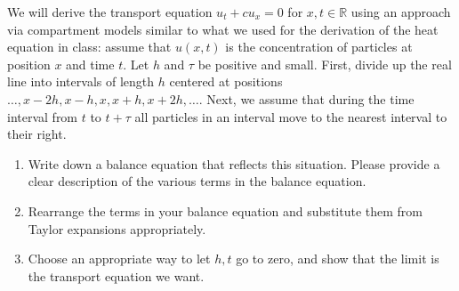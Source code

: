 \documentclass[plain]{pset}
\begin{document}
\begin{problem}
We will derive the transport equation \(u_t + cu_x = 0\) for \(x, t \in \mathbb{R}\) using an approach via compartment models similar to what we used for the derivation of the heat equation in class: assume that \(u(x, t)\) is the concentration of particles at position \(x\) and time \(t\). Let \(h\) and \(\tau\) be positive and small. First, divide up the real line into intervals of length \(h\) centered at positions \(\hdots, x-2h, x-h, x, x+h, x+2h, \hdots\). Next, we assume that during the time interval from \(t\) to \(t + \tau\) all particles in an interval move to the nearest interval to their right.
\begin{enumerate}[label = (\alph*)]
    \item Write down a balance equation that reflects this situation. Please provide a clear description of the various terms in the balance equation.
    \item Rearrange the terms in your balance equation and substitute them from Taylor expansions appropriately.
    \item Choose an appropriate way to let \(h, t\) go to zero, and show that the limit is the transport equation we want.
\end{enumerate}
\end{problem}
\end{document}
